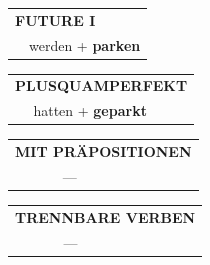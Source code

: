 \documentclass[10pt,a4paper]{revtex4-2}
\begin{document}
\begin{verbbox}
\begin{tabular}{rl}
    \multicolumn{2}{l}{\textbf{FUTURE I} }\\
  &  werden + \textbf{parken}\\
 
  \end{tabular}
\hfill
   \begin{tabular}{rl}
      \multicolumn{2}{l}{\textbf{PLUSQUAMPERFEKT}}\\
   & hatten + \textbf{geparkt}\\
  \end{tabular}
  
  \vspace{10pt}

\begin{tabular}{lll}
\multicolumn{3}{l}{\textbf{MIT PRÄPOSITIONEN}}\\
& ---\\
\end{tabular}
\hfill
\begin{tabular}{lll}
\multicolumn{3}{l}{\textbf{TRENNBARE VERBEN}}\\
& ---\\
\end{tabular}

\end{verbbox}
\end{document}
